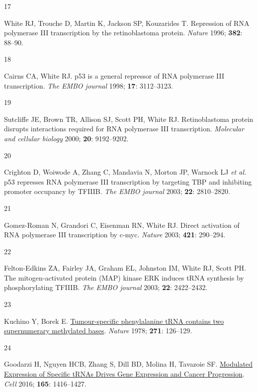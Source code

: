 \documentclass[
  11pt,
]{article}
\newlength{\cslhangindent}
\newlength{\csllabelwidth}
\newlength{\cslentryspacingunit} %
\newenvironment{CSLReferences}[2] %
 {%
  \setlength{\parindent}{0pt}
  \ifodd #1
  \let\oldpar\par
  \def\par{\hangindent=\cslhangindent\oldpar}
  \fi
  \setlength{\parskip}{#2\cslentryspacingunit}
 }%
 {}
\newcommand{\CSLLeftMargin}[1]{\parbox[t]{\csllabelwidth}{#1}}
\newcommand{\CSLRightInline}[1]{\parbox[t]{\linewidth - \csllabelwidth}{#1}\break}
\begin{document}
\begin{CSLReferences}{0}{0}
\leavevmode{}%
\CSLLeftMargin{17 }%
\CSLRightInline{White RJ, Trouche D, Martin K, Jackson SP, Kouzarides T. Repression of {RNA} polymerase {III} transcription by the retinoblastoma protein. \emph{Nature} 1996; \textbf{382}: 88--90.}

\leavevmode{}%
\CSLLeftMargin{18 }%
\CSLRightInline{Cairns CA, White RJ. p53 is a general repressor of {RNA} polymerase {III} transcription. \emph{The EMBO journal} 1998; \textbf{17}: 3112--3123.}

\leavevmode{}%
\CSLLeftMargin{19 }%
\CSLRightInline{Sutcliffe JE, Brown TR, Allison SJ, Scott PH, White RJ. Retinoblastoma protein disrupts interactions required for {RNA} polymerase {III} transcription. \emph{Molecular and cellular biology} 2000; \textbf{20}: 9192--9202.}

\leavevmode{}%
\CSLLeftMargin{20 }%
\CSLRightInline{Crighton D, Woiwode A, Zhang C, Mandavia N, Morton JP, Warnock LJ \emph{et al.} p53 represses {RNA} polymerase {III} transcription by targeting {TBP} and inhibiting promoter occupancy by {TFIIIB}. \emph{The EMBO journal} 2003; \textbf{22}: 2810--2820.}

\leavevmode{}%
\CSLLeftMargin{21 }%
\CSLRightInline{Gomez-Roman N, Grandori C, Eisenman RN, White RJ. Direct activation of {RNA} polymerase {III} transcription by c-myc. \emph{Nature} 2003; \textbf{421}: 290--294.}

\leavevmode{}%
\CSLLeftMargin{22 }%
\CSLRightInline{Felton-Edkins ZA, Fairley JA, Graham EL, Johnston IM, White RJ, Scott PH. The mitogen-activated protein ({MAP}) kinase {ERK} induces {tRNA} synthesis by phosphorylating {TFIIIB}. \emph{The EMBO journal} 2003; \textbf{22}: 2422--2432.}

\leavevmode{}%
\CSLLeftMargin{23 }%
\CSLRightInline{Kuchino Y, Borek E. \href{https://doi.org/10.1038/271126a0}{Tumour-specific phenylalanine tRNA contains two supernumerary methylated bases}. \emph{Nature} 1978; \textbf{271}: 126--129.}

\leavevmode{}%
\CSLLeftMargin{24 }%
\CSLRightInline{Goodarzi H, Nguyen HCB, Zhang S, Dill BD, Molina H, Tavazoie SF. \href{https://doi.org/10.1016/j.cell.2016.05.046}{Modulated Expression of Specific tRNAs Drives Gene Expression and Cancer Progression}. \emph{Cell} 2016; \textbf{165}: 1416--1427.}


\end{CSLReferences}
\end{document}
